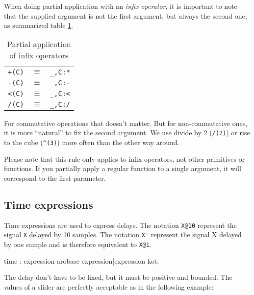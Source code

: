 When doing partial application with an \emph{infix operator}, it is important to note that the supplied argument is not the first argument, but always the second one, as summarized table \ref{tab:partialrules}. 


\begin{table}[h]
	\begin{center}
	\begin{tabular}{|rcl|}
	\hline
	\lstinline'+(C)' & $\equiv$ & \lstinline'_,C:*'\\
	\lstinline'-(C)' & $\equiv$ & \lstinline'_,C:-'\\
	\lstinline'<(C)' & $\equiv$ & \lstinline'_,C:<'\\
	\lstinline'/(C)' & $\equiv$ & \lstinline'_,C:/'\\
	\hline
	\end{tabular}
	\end{center}
	\caption{Partial application of infix operators}
	\label{tab:partialrules}
\end{table}

For commutative operations that doesn't matter. But for non-commutative ones, it is more ``natural'' to fix the second argument.  We use divide by 2 (\lstinline'/(2)') or rise to the cube (\lstinline'^(3)') more often than the other way around.

Please note that this rule only applies to infix operators, not other primitives or functions. If you partially apply a regular function to a single argument, it will correspond to the first parameter.

\subsection{Time expressions}

Time expressions are used to express delays. The notation \lstinline'X@10' represent the signal \lstinline'X' delayed by 10 samples. The notation \lstinline"X'" represent the signal X delayed by one sample and is therefore equivalent to \lstinline'X@1'.

\begin{rail}
time : expression arobase expression|expression kot; 
\end{rail}

The delay don't have to be fixed, but it must be positive and bounded. The values of a slider are perfectly acceptable as in the following example:

